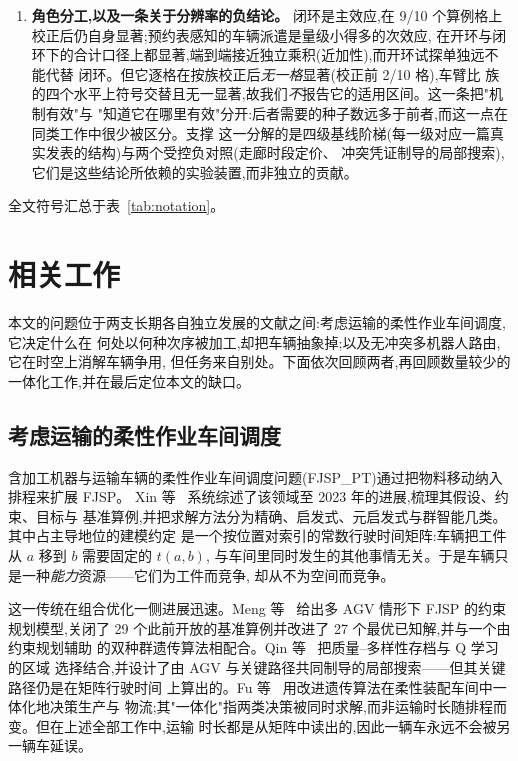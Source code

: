 \documentclass[manuscript,screen,review]{acmart}
\newcommand{\NCases}{10}
\newcommand{\CellsSigLoopAdj}{9}
\newcommand{\CellsSigProbe}{2}
\begin{document}
\begin{enumerate}[leftmargin=*]
\item \textbf{角色分工,以及一条关于分辨率的负结论。} 闭环是主效应,在
\CellsSigLoopAdj{}/\NCases{} 个算例格上校正后仍自身显著;预约表感知的车辆派遣是量级小得多的次效应,
在开环与闭环下的合计口径上都显著,端到端接近独立乘积(近加性),而开环试探单独远不能代替
闭环。但它逐格在按族校正后\emph{无一格}显著(校正前 \CellsSigProbe{}/\NCases{} 格),车臂比
族的四个水平上符号交替且无一显著,故我们\emph{不}报告它的适用区间。这一条把"机制有效"与
"知道它在哪里有效"分开:后者需要的种子数远多于前者,而这一点在同类工作中很少被区分。支撑
这一分解的是四级基线阶梯(每一级对应一篇真实发表的结构)与两个受控负对照(走廊时段定价、
冲突凭证制导的局部搜索),它们是这些结论所依赖的实验装置,而非独立的贡献。

\end{enumerate}

全文符号汇总于表~\ref{tab:notation}。



\section{相关工作}
\label{sec:Chapter_II}

本文的问题位于两支长期各自独立发展的文献之间:考虑运输的柔性作业车间调度,它决定什么在
何处以何种次序被加工,却把车辆抽象掉;以及无冲突多机器人路由,它在时空上消解车辆争用,
但任务来自别处。下面依次回顾两者,再回顾数量较少的一体化工作,并在最后定位本文的缺口。

\subsection{考虑运输的柔性作业车间调度}

含加工机器与运输车辆的柔性作业车间调度问题(FJSP\_PT)通过把物料移动纳入排程来扩展 FJSP。
Xin 等~\cite{xin2025review} 系统综述了该领域至 2023 年的进展,梳理其假设、约束、目标与
基准算例,并把求解方法分为精确、启发式、元启发式与群智能几类。其中占主导地位的建模约定
是一个按位置对索引的常数行驶时间矩阵:车辆把工件从 $a$ 移到 $b$ 需要固定的 $t(a,b)$,
与车间里同时发生的其他事情无关。于是车辆只是一种\emph{能力}资源——它们为工件而竞争,
却从不为空间而竞争。

这一传统在组合优化一侧进展迅速。Meng 等~\cite{meng2025cp} 给出多 AGV 情形下 FJSP 的约束
规划模型,关闭了 29 个此前开放的基准算例并改进了 27 个最优已知解,并与一个由约束规划辅助
的双种群遗传算法相配合。Qin 等~\cite{qin2026knowledge} 把质量--多样性存档与 Q 学习的区域
选择结合,并设计了由 AGV 与关键路径共同制导的局部搜索——但其关键路径仍是在矩阵行驶时间
上算出的。Fu 等~\cite{fu2025integrated} 用改进遗传算法在柔性装配车间中一体化地决策生产与
物流;其"一体化"指两类决策被同时求解,而非运输时长随排程而变。但在上述全部工作中,运输
时长都是从矩阵中读出的,因此一辆车永远不会被另一辆车延误。
\end{document}
